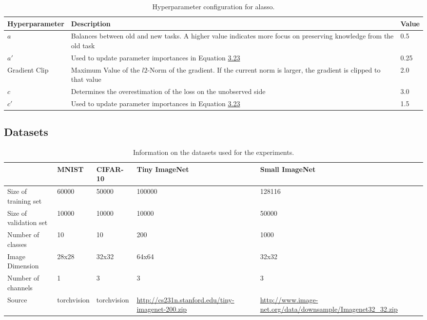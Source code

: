 \begin{table}[!htb]
    \centering
    \begin{tabularx}{\textwidth}{| l | X | l |} 
        \hline
        Hyperparameter & Description & Value \\ 
        \hline 
        $a$ & Balances between old and new tasks. A higher value indicates more focus
        on preserving knowledge from the old task & 0.5  \\ 
        \hline
        $a'$ & Used to update parameter importances in Equation \hyperref[eq:ALASSO_Small_Omega]{3.23} & 0.25  \\
        \hline
        Gradient Clip & Maximum Value of the $l2$-Norm of the gradient. If the current norm is larger, the
        gradient is clipped to that value & 2.0 \\ 
        \hline
        $c$ & Determines the overestimation of the loss on the unobserved side & 3.0 \\
        \hline
        $c'$ & Used to update parameter importances in Equation \hyperref[eq:ALASSO_Small_Omega]{3.23} & 1.5 \\
        \hline
    \end{tabularx}
    \caption{Hyperparameter configuration for \gls{alasso}.}
    \label{fig:AlassoParams}
\end{table}

\subsection{Datasets}
\label{sec:Appendix:Datasets}

\begin{table}[!htb]
    \centering
    \begin{tabularx}{\textwidth}{|X | X X X X|} 
        \hline
         & MNIST & CIFAR-10 & Tiny \newline ImageNet & Small \newline ImageNet \\ 
        \hline 
        Size of training set & 60000 & 50000 & 100000 & 128116 \\ 
        Size of validation set & 10000 & 10000 & 10000 & 50000\\
        Number of classes & 10 & 10 & 200 & 1000 \\
        Image Dimension & 28x28 & 32x32 & 64x64& 32x32\\
        Number of channels & 1 & 3 & 3 & 3 \\
        Source & torchvision & torchvision & {\small \url{http://cs231n.stanford.edu/tiny-imagenet-200.zip}} & {\small \url{http://www.image-net.org/data/downsample/Imagenet32_32.zip}} \\
        \hline
    \end{tabularx}
    \caption{Information on the datasets used for the experiments.}
    \label{fig:DatasetInformtion}
\end{table}

